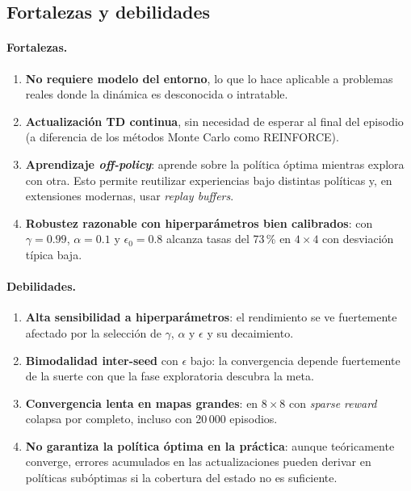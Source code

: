 \documentclass[11pt,a4paper]{article}
\begin{document}
\subsection{Fortalezas y debilidades}

\paragraph{Fortalezas.}
\begin{enumerate}
  \item \textbf{No requiere modelo del entorno}, lo que lo hace aplicable a problemas reales donde la dinámica es desconocida o intratable.
  \item \textbf{Actualización TD continua}, sin necesidad de esperar al final del episodio (a diferencia de los métodos Monte Carlo como REINFORCE).
  \item \textbf{Aprendizaje \emph{off-policy}}: aprende sobre la política óptima mientras explora con otra. Esto permite reutilizar experiencias bajo distintas políticas y, en extensiones modernas, usar \emph{replay buffers}.
  \item \textbf{Robustez razonable con hiperparámetros bien calibrados}: con $\gamma=0.99$, $\alpha=0.1$ y $\epsilon_0=0.8$ alcanza tasas del 73\,\% en $4\times 4$ con desviación típica baja.
\end{enumerate}

\paragraph{Debilidades.}
\begin{enumerate}
  \item \textbf{Alta sensibilidad a hiperparámetros}: el rendimiento se ve fuertemente afectado por la selección de $\gamma$, $\alpha$ y $\epsilon$ y su decaimiento.
  \item \textbf{Bimodalidad inter-seed} con $\epsilon$ bajo: la convergencia depende fuertemente de la suerte con que la fase exploratoria descubra la meta.
  \item \textbf{Convergencia lenta en mapas grandes}: en $8\times 8$ con \emph{sparse reward} colapsa por completo, incluso con 20\,000 episodios.
  \item \textbf{No garantiza la política óptima en la práctica}: aunque teóricamente converge, errores acumulados en las actualizaciones pueden derivar en políticas subóptimas si la cobertura del estado no es suficiente.
\end{enumerate}
\end{document}
